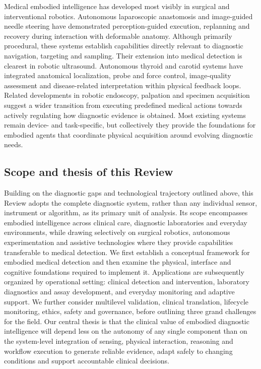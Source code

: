 \documentclass[12pt,a4paper]{article}
\begin{document}
Medical embodied intelligence has developed most visibly in surgical and interventional robotics. Autonomous laparoscopic anastomosis and image-guided needle steering have demonstrated perception-guided execution, replanning and recovery during interaction with deformable anatomy. Although primarily procedural, these systems establish capabilities directly relevant to diagnostic navigation, targeting and sampling. Their extension into medical detection is clearest in robotic ultrasound. Autonomous thyroid and carotid systems have integrated anatomical localization, probe and force control, image-quality assessment and disease-related interpretation within physical feedback loops. Related developments in robotic endoscopy, palpation and specimen acquisition suggest a wider transition from executing predefined medical actions towards actively regulating how diagnostic evidence is obtained. Most existing systems remain device- and task-specific, but collectively they provide the foundations for embodied agents that coordinate physical acquisition around evolving diagnostic needs.


\subsection{Scope and thesis of this Review}
\label{subsec:scope_thesis}

Building on the diagnostic gaps and technological trajectory outlined above, this Review adopts the complete diagnostic system, rather than any individual sensor, instrument or algorithm, as its primary unit of analysis. Its scope encompasses embodied intelligence across clinical care, diagnostic laboratories and everyday environments, while drawing selectively on surgical robotics, autonomous experimentation and assistive technologies where they provide capabilities transferable to medical detection. We first establish a conceptual framework for embodied medical detection and then examine the physical, interface and cognitive foundations required to implement it. Applications are subsequently organized by operational setting: clinical detection and intervention, laboratory diagnostics and assay development, and everyday monitoring and adaptive support. We further consider multilevel validation, clinical translation, lifecycle monitoring, ethics, safety and governance, before outlining three grand challenges for the field. Our central thesis is that the clinical value of embodied diagnostic intelligence will depend less on the autonomy of any single component than on the system-level integration of sensing, physical interaction, reasoning and workflow execution to generate reliable evidence, adapt safely to changing conditions and support accountable clinical decisions.
\end{document}
